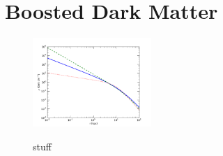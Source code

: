 \chapter{Boosted Dark Matter}
\label{ch:boosted_dm}
\graphicspath{{Boosted_dm/}}
\begin{figure}
 		\includegraphics[width=0.4\textwidth]{figures/DM_Halo_density.pdf}
		\label{fig:dm_density}
\caption{stuff}
\end{figure}








